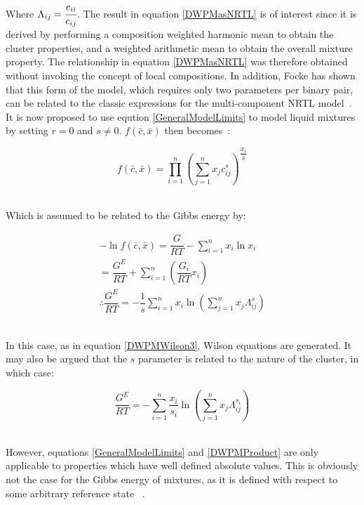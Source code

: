 Where $\Lambda_{ij} = \cfrac{c_{ii}}{c_{ij}}$. The result in equation \ref{DWPMasNRTL} is of interest since it is derived by performing a composition weighted harmonic mean to obtain the cluster properties, and a weighted arithmetic mean to obtain the overall mixture property. The relationship in equation \ref{DWPMasNRTL} was therefore obtained without invoking the concept of local compositions. In addition, Focke has shown that this form of the model, which requires only two parameters per binary pair, can be related to the classic expressions for the multi-component NRTL model~\cite{WeightedPowerMeanModel}.\\

It is now proposed to use eqution \ref{GeneralModelLimits} to model liquid mixtures by setting $r=0$ and $s\neq0$. $f\left( \bar{c}, \bar{x}\right)$ then becomes~\cite{WeightedPowerMeanModel, FockeSandrock}:\

\begin{equation}
f\left( \bar{c}, \bar{x}\right) = \prod_{i=1}^{n} \left(\sum_{j=1}^{n} x_{j}c_{ij}^s\right)^{\dfrac{x_{i}}{s}} \label{DWPMProduct}
\end{equation}\ 

Which is assumed to be related to the Gibbs energy by:\

\begin{eqnarray}
-\ln f\left( \bar{c}, \bar{x}\right) = \dfrac{G}{RT} - \sum_{i=1}^{n} x_{i}\ln x_{i}\\
= \dfrac{G^{E}}{RT} + \sum_{i=1}^{n}\left(\dfrac{G_{i}}{RT}x_{i}\right)\\
\therefore \dfrac{G^{E}}{RT}  = -\dfrac{1}{s}\sum_{i=1}^{n} x_{i} \ln \left(\sum_{j=1}^{n}x_{j} \Lambda_{ij}^{s}\right) \label{DWPMWilson3}
\end{eqnarray}\

In this case, as in equation \ref{DWPMWilson3}, Wilson equations are generated. It may also be argued that the $s$ parameter is related to the nature of the cluster, in which case:\

\begin{equation}
\dfrac{G^{E}}{RT}  = -\sum_{i=1}^{n} \dfrac{x_{i}}{s_{i}} \ln \left(\sum_{j=1}^{n}x_{j} \Lambda_{ij}^{s_{i}}\right) \label{DWPMWilsonLike}
\end{equation}\

However, equations \ref{GeneralModelLimits} and \ref{DWPMProduct} are only applicable to properties which have well defined absolute values. This is obviously not the case for the Gibbs energy of mixtures, as it is defined with respect to some arbitrary reference state ~\cite{WeightedPowerMeanModel}.\\

